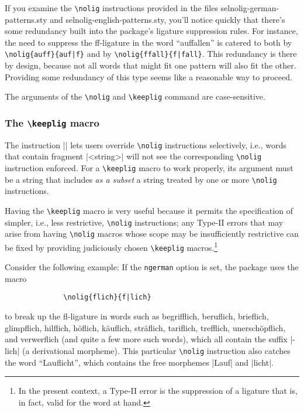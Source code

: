 \documentclass[11pt]{article}
\newcommand{\pkg}[1]{\textsf{#1}}
\newcommand{\opt}[1]{\texttt{#1}}
\newcommand{\cmmd}[1]{\texttt{\textbackslash #1}}
\begin{document}
If you examine the \cmmd{nolig} instructions provided in the files \pkg{selnolig-german-patterns.sty} and \pkg{selnolig-english-patterns.sty}, you'll notice quickly that there's some redundancy built into the package's ligature suppression rules. For instance, the need to suppress the ff-ligature in the word \enquote{auffallen} is catered to both by \Verb+\nolig{auff}{auf|f}+ and by \Verb+\nolig{ffall}{f|fall}+. This redundancy is there by design, because not all words that might fit one pattern will also fit the other. Providing some redundancy of this type seems like a reasonable way to proceed.

The arguments of the \cmmd{nolig} and \cmmd{keeplig} command are case-sensitive. 

\subsubsection{The \cmmd{keeplig} macro} 
\label{sec:keeplig}


The instruction || lets users override \cmmd{nolig} instructions selectively, i.e., words that contain fragment |<string>| will not see the corresponding \cmmd{nolig} instruction enforced. For a \cmmd{keeplig} macro to work properly, its argument must be a string that includes \emph{as a subset} a string treated by one or more \cmmd{nolig} instructions.

Having the \cmmd{keeplig} macro is very useful because it permits the specification of simpler, i.e., less restrictive, \cmmd{nolig} instructions; any Type-II errors that may arise from having \cmmd{nolig} macros whose scope may be insufficiently restrictive can be fixed by providing judiciously chosen \cmmd{keeplig} macros.\footnote{In the present context, a Type-II error is the suppression of a ligature that is, in fact, valid for the word at hand.}

Consider the following example: If the \opt{ngerman} option is set, the package uses the macro 
\begin{Verbatim}
              \nolig{flich}{f|lich}
\end{Verbatim}
to break up the fl-ligature in words such as begrifflich, beruflich, brieflich, glimpflich, hilflich, höflich, käuflich, sträflich, tariflich, trefflich, unerschöpflich, and verwerflich (and quite a few more such words), which all contain the suffix |-lich| (a derivational morpheme). This particular \cmmd{nolig} instruction also catches the word \enquote{Lauflicht}, which contains the free morphemes |Lauf| and |licht|. 
\end{document}
